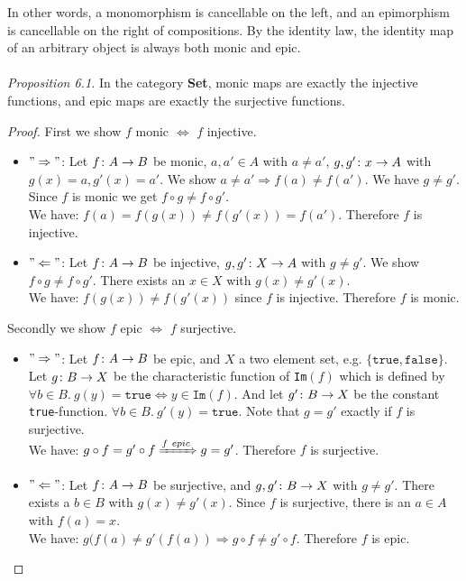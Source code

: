 In other words, a monomorphism is cancellable on the left, and an epimorphism is cancellable on the right of compositions.
By the identity law, the identity map of an arbitrary object is always both monic and epic.\\
\\ \textit{Proposition 6.1.} In the category \textbf{Set}, monic maps are exactly the injective functions, and epic maps are exactly the surjective functions.
\begin{proof}
  First we show $f$ monic $\Leftrightarrow$ $f$ injective.
  \begin{itemize}
  \item $"\Rightarrow"$: Let $f \from A \to B$ be monic, $a, a' \in A$ with $a \neq a'$, $g, g' \from {x} \to A$ with $g(x) = a, g'(x) = a'$.
    We show $a \neq a' \Rightarrow f(a) \neq f(a')$.
    We have $g \neq g'$.
    Since $f$ is monic we get $f \circ g \neq f \circ g'$.\\
    We have: $f(a) = f(g(x)) \neq f(g'(x)) = f(a')$. Therefore $f$ is injective.
  \item $"\Leftarrow"$: Let $f \from A \to B$ be injective, $g, g' \from X \to A$ with $g \neq g'$.
    We show $f \circ g \neq f \circ g'$.
    There exists an $x \in X$ with $g(x) \neq g'(x)$.\\
    We have: $f(g(x)) \neq f(g'(x))$ since $f$ is injective.
    Therefore $f$ is monic.
  \end{itemize}
  Secondly we show $f$ epic $\Leftrightarrow$ $f$ surjective.
  \begin{itemize}
  \item $"\Rightarrow"$: Let $f \from A \to B$ be epic, and $X$ a two element set, e.g. $\{ \texttt{true}, \texttt{false}\}$.
    Let $g \from B \to X$ be the characteristic function of \texttt{Im}$(f)$ which is defined by
    $\forall b \in B. \ g(y) = \texttt{true}
    \Leftrightarrow y \in \texttt{Im}(f)$.
    And let $g' \from B \to X$ be the constant \texttt{true}-function.
    $\forall b \in B. \ g'(y) = \texttt{true}$.
    Note that $g = g'$ exactly if $f$ is surjective.\\
    We have: $g \of f = g' \of f \xRightarrow{f \ epic} g = g'$.
    Therefore $f$ is surjective.
  \item $"\Leftarrow"$: Let $f \from A \to B$ be surjective, and $g, g' \from B \to X$ with $g \neq g'$.
    There exists a $b \in B$ with $g(x) \neq g'(x)$.
    Since $f$ is surjective, there is an $a \in A$ with $f(a) = x$.\\
    We have: $g(f(a) \neq g'(f(a)) \Rightarrow g \circ f \neq g' \circ f$.
    Therefore $f$ is epic.
  \end{itemize}
\end{proof}
